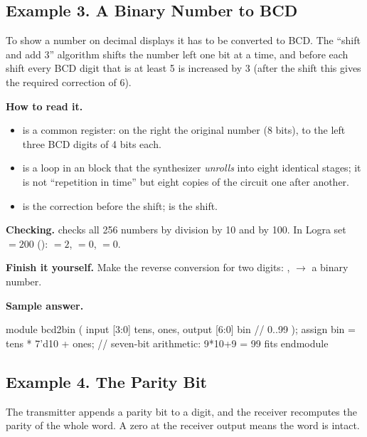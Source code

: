 \subsection{Example 3. A Binary Number to BCD}

To show a number on decimal displays it has to be converted to BCD. The
``shift and add 3'' algorithm shifts the number left one bit at a time, and
before each shift every BCD digit that is at least 5 is increased by 3 (after
the shift this gives the required correction of 6).


\textbf{How to read it.}
\begin{itemize}
  \item {} is a common register: on the right the original number (8 bits), to the left three BCD digits of 4 bits each.
  \item {} is a loop in an  block that the synthesizer \emph{unrolls} into eight identical stages; it is not ``repetition in time'' but eight copies of the circuit one after another.
  \item {} is the correction before the shift;  is the shift.
\end{itemize}
\textbf{Checking.}  checks all 256 numbers by division by 10
and by 100. In Logra set $=200$ (): $=2$,
$=0$, $=0$.

\textbf{Finish it yourself.} Make the reverse conversion for two digits:
,  $\to$ a binary number.

\textbf{Sample answer.}\par\nopagebreak
\begin{vcode}
module bcd2bin (
    input  [3:0] tens, ones,
    output [6:0] bin          // 0..99
);
    assign bin = tens * 7'd10 + ones;   // seven-bit arithmetic: 9*10+9 = 99 fits
endmodule
\end{vcode}

\subsection{Example 4. The Parity Bit}

The transmitter appends a parity bit to a digit, and the receiver recomputes the
parity of the whole word. A zero at the receiver output means the word is
intact.

